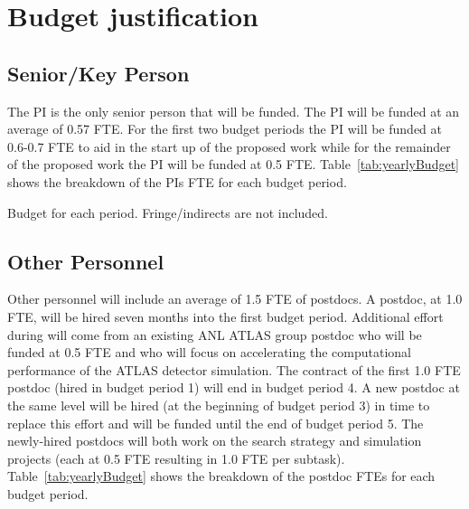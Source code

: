 \documentclass[letter, USenglish, 11pt, subfigure]{article}
\title{}
\author{Walter Hopkins, Assistant Physicist\\
}
\date{}
\begin{document}

\maketitle

\section{Budget justification}

\subsection{Senior/Key Person}
\label{subsec:keyPerson}
The PI is the only senior person that will be funded. The PI will be funded at an average of 0.57 FTE. For the first two budget periods the PI will be funded at 0.6-0.7 FTE to aid in the start up of the proposed work while for the remainder of the proposed work the PI will be funded at 0.5 FTE. Table~\ref{tab:yearlyBudget} shows the breakdown of the PIs FTE for each budget period.

\begin{table}[!htpb]
  \begin{center}
    \caption{Budget for each period. Fringe/indirects are not included.}
      \label{tab:yearlyBudget}
  
  \end{center}
\end{table}

\subsection{Other Personnel}
\label{subsec:personnel}
Other personnel will include an average of 1.5 FTE of postdocs. A postdoc, at 1.0 FTE, will be hired seven months into the first budget period. Additional effort during will come from an existing ANL ATLAS group postdoc who will be funded at 0.5 FTE and who will focus on accelerating the computational performance of the ATLAS detector simulation. The contract of the first 1.0 FTE postdoc (hired in budget period 1) will end in budget period 4. A new postdoc at the same level will be hired (at the beginning of budget period 3) in time to replace this effort and will be funded until the end of budget period 5. The newly-hired postdocs will both work on the search strategy and simulation projects (each at 0.5 FTE resulting in 1.0 FTE per subtask). Table~\ref{tab:yearlyBudget} shows the breakdown of the postdoc FTEs for each budget period.
\clearpage
\end{document}
